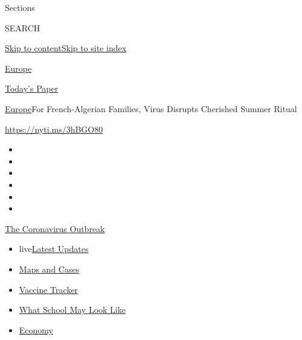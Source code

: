 Sections

SEARCH

\protect\hyperlink{site-content}{Skip to
content}\protect\hyperlink{site-index}{Skip to site index}

\href{https://www.nytimes.com/section/world/europe}{Europe}

\href{https://myaccount.nytimes.com/auth/login?response_type=cookie\&client_id=vi}{}

\href{https://www.nytimes.com/section/todayspaper}{Today's Paper}

\href{/section/world/europe}{Europe}\textbar{}For French-Algerian
Families, Virus Disrupts Cherished Summer Ritual

\url{https://nyti.ms/3hBGO80}

\begin{itemize}
\item
\item
\item
\item
\item
\item
\end{itemize}

\href{https://www.nytimes.com/news-event/coronavirus?action=click\&pgtype=Article\&state=default\&region=TOP_BANNER\&context=storylines_menu}{The
Coronavirus Outbreak}

\begin{itemize}
\tightlist
\item
  live\href{https://www.nytimes.com/2020/08/01/world/coronavirus-covid-19.html?action=click\&pgtype=Article\&state=default\&region=TOP_BANNER\&context=storylines_menu}{Latest
  Updates}
\item
  \href{https://www.nytimes.com/interactive/2020/us/coronavirus-us-cases.html?action=click\&pgtype=Article\&state=default\&region=TOP_BANNER\&context=storylines_menu}{Maps
  and Cases}
\item
  \href{https://www.nytimes.com/interactive/2020/science/coronavirus-vaccine-tracker.html?action=click\&pgtype=Article\&state=default\&region=TOP_BANNER\&context=storylines_menu}{Vaccine
  Tracker}
\item
  \href{https://www.nytimes.com/interactive/2020/07/29/us/schools-reopening-coronavirus.html?action=click\&pgtype=Article\&state=default\&region=TOP_BANNER\&context=storylines_menu}{What
  School May Look Like}
\item
  \href{https://www.nytimes.com/live/2020/07/31/business/stock-market-today-coronavirus?action=click\&pgtype=Article\&state=default\&region=TOP_BANNER\&context=storylines_menu}{Economy}
\end{itemize}

